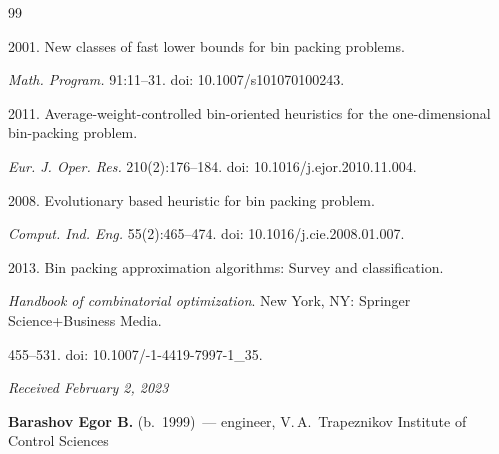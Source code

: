 {{\begin{thebibliography}{99}

 2001. New classes of fast lower bounds for bin packing problems. 

\textit{Math. Program.} 91:11--31. doi: 10.1007\!/\!s101070100243.




 2011. Average-weight-controlled bin-oriented heuristics for the one-dimensional bin-packing problem. 

\textit{Eur. J. Oper. Res.} 210(2):176--184. doi: 10.1016\!/\!j.ejor.2010.11.004.




 2008. Evolutionary based heuristic for bin packing problem. 

\textit{Comput. Ind. Eng.} 55(2):465--474. doi: 10.1016\!/\!j.cie.2008.01.007.





 2013. Bin packing approximation algorithms: Survey and classification. 

 \textit{Handbook of combinatorial optimization}. New York, NY: Springer Science\;+\;Business Media.

 455--531. doi: 10.1007\!/-1-4419-7997-1\_35.

\end{thebibliography}

} }



\vspace*{-6pt}



\hfill{\small\textit{Received February 2, 2023}} 



\vspace*{-12pt} 





\Contr



\vspace*{-4pt}





\noindent

\textbf{Barashov Egor B.} (b.\ 1999)~--- engineer, V.\,A.~Trapeznikov Institute of Control Sciences

